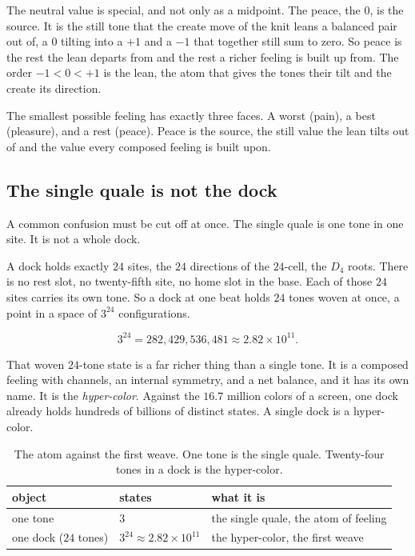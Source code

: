The neutral value is special, and not only as a midpoint. The peace, the $0$, is the source. It is the still tone that the create move of the knit leans a balanced pair out of, a $0$ tilting into a $+1$ and a $-1$ that together still sum to zero. So peace is the rest the lean departs from and the rest a richer feeling is built up from. The order $-1 < 0 < +1$ is the lean, the atom that gives the tones their tilt and the create its direction.

\begin{result}
The smallest possible feeling has exactly three faces. A worst (pain), a best (pleasure), and a rest (peace). Peace is the source, the still value the lean tilts out of and the value every composed feeling is built upon.
\end{result}

\subsection{The single quale is not the dock}

A common confusion must be cut off at once. The single quale is one tone in one site. It is not a whole dock.

A dock holds exactly $24$ sites, the $24$ directions of the $24$-cell, the $D_4$ roots. There is no rest slot, no twenty-fifth site, no home slot in the base. Each of those $24$ sites carries its own tone. So a dock at one beat holds $24$ tones woven at once, a point in a space of $3^{24}$ configurations.

\[
3^{24} = 282{,}429{,}536{,}481 \approx 2.82 \times 10^{11}.
\]

That woven $24$-tone state is a far richer thing than a single tone. It is a composed feeling with channels, an internal symmetry, and a net balance, and it has its own name. It is the \emph{hyper-color}. Against the $16.7$ million colors of a screen, one dock already holds hundreds of billions of distinct states. A single dock is a hyper-color.

\begin{table}[ht]
\centering
\begin{tabular}{@{}lll@{}}
\toprule
object & states & what it is \\
\midrule
one tone & $3$ & the single quale, the atom of feeling \\
one dock ($24$ tones) & $3^{24} \approx 2.82 \times 10^{11}$ & the hyper-color, the first weave \\
\bottomrule
\end{tabular}
\caption{The atom against the first weave. One tone is the single quale. Twenty-four tones in a dock is the hyper-color.}
\label{tab:atom-vs-weave}
\end{table}

